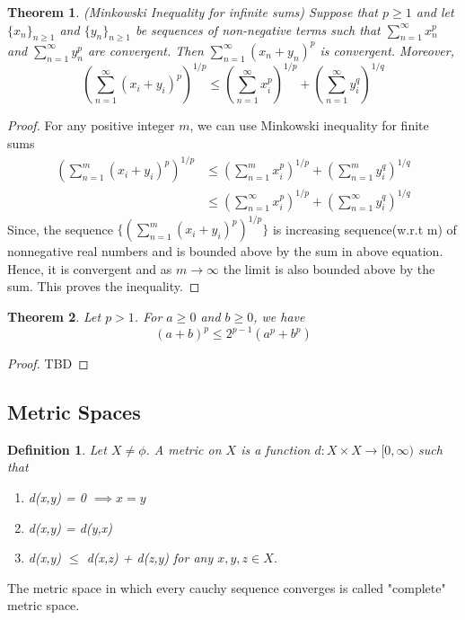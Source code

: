 \documentclass[12pt]{report}
\newtheorem{thm}{Theorem}
\newtheorem{defn}{Definition}
\begin{document}
\begin{thm}
    (Minkowski Inequality for infinite sums) Suppose that $p \geq 1$ and let $\{x_n\}_{n \geq 1}$ and $\{y_n\}_{n \geq 1}$ be sequences of non-negative terms such that $\sum\limits_{n=1}^{\infty} x_n^p$ and $\sum\limits_{n=1}^{\infty} y_n^p$ are convergent. Then $\sum\limits_{n=1}^{\infty} (x_n + y_n)^p$ is convergent. Moreover,
    $$ \left(\sum\limits_{n =1}^{\infty}(x_i + y_i)^p\right)^{1/p} \leq \left(\sum\limits_{n =1}^{\infty}x_i^p\right)^{1/p} + \left(\sum\limits_{n =1}^{\infty}y_i^q\right)^{1/q} $$
\end{thm}
\begin{proof}
    For any positive integer $m$, we can use Minkowski inequality for finite sums 
    \begin{align*}
        \left(\sum\limits_{n =1}^m(x_i + y_i)^p\right)^{1/p} &\leq \left(\sum\limits_{n =1}^mx_i^p\right)^{1/p} + \left(\sum\limits_{n =1}^my_i^q\right)^{1/q}\\
        &\leq \left(\sum\limits_{n =1}^{\infty}x_i^p\right)^{1/p} + \left(\sum\limits_{n =1}^{\infty}y_i^q\right)^{1/q}
    \end{align*}
    Since, the sequence $\{(\sum\limits_{n =1}^m(x_i + y_i)^p)^{1/p}\}$ is increasing sequence(w.r.t m) of nonnegative real numbers and is bounded above by the sum in above equation. Hence, it is convergent and as $m \to \infty$ the limit is also bounded above by the sum. This proves the inequality.
\end{proof}
\begin{thm}
    Let $p > 1$. For $ a \geq 0$ and $ b \geq 0$, we have
    $$ (a + b)^p \leq 2^{p-1}(a^p + b^p)$$
\end{thm}
\begin{proof}
    TBD
\end{proof}
\subsection*{Metric Spaces}
\begin{defn}
    Let $X \neq \phi$. A metric on $X$ is a function $d:X \times X \to [0, \infty)$ such that 
    \begin{enumerate}
        \item d(x,y) = 0 $\implies x = y$
        \item d(x,y) = d(y,x)
        \item d(x,y) $\leq$ d(x,z) + d(z,y) for any $x,y,z \in X$.
    \end{enumerate}
\end{defn}
The metric space in which every cauchy sequence converges is called "complete" metric space.
\end{document}
